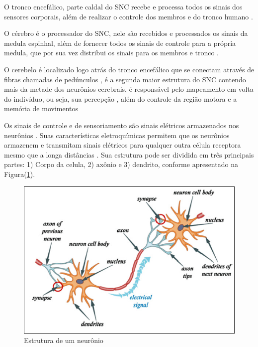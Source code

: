 O tronco encefálico, parte caldal do SNC recebe e processa todos os sinais dos sensores corporais, além de realizar o controle dos membros e do tronco humano \cite{KANDEL}.

O cérebro é o processador do SNC, nele são recebidos e processados os sinais da medula espinhal, além de fornecer todos os sinais de controle para a própria medula, que por sua vez distribui os sinais para os membros e tronco \cite{KANDEL}.

O cerebelo é localizado logo atrás do tronco encefálico que se conectam através de fibras chamadas de pedúnculos \cite{KANDEL}, é a segunda maior estrutura do SNC contendo mais da metade dos neurônios cerebrais, \cite{SIULYDissertacao} é responsável pelo mapeamento em volta do indivíduo, ou seja, sua percepção \cite{alvarezneurobiomecanismos}, além do controle da região motora e a memória de movimentos \cite{SIULYDissertacao,alvarezneurobiomecanismos}

Os sinais de controle e de sensoriamento são sinais elétricos armazenados nos neurônios \cite{KANDEL}. Suas características eletroquímicas permitem que os neurônios armazenem e transmitam sinais elétricos para qualquer outra célula receptora mesmo que a longa distâncias \cite{SIULYDissertacao}. Sua estrutura pode ser dividida em três principais partes: 1) Corpo da celula, 2) axônio e 3) dendrito, conforme apresentado na Figura(\ref{neuronParts}).
\begin{figure}[h]
	\centering
	\includegraphics[keepaspectratio=true,scale=1.0]{figuras/Estrutura_neuronio.PNG}
	\caption{Estrutura de um neurônio \cite{SIULYDissertacao}}
	\label{neuronParts}
\end{figure}

